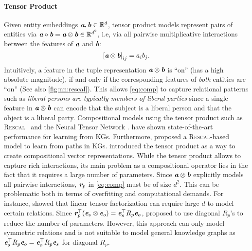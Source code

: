 \documentclass[letterpaper]{article}
\renewcommand{\vec}[1]{\textit{\textbf{#1}}}
\newcommand{\ve}{\vec{e}}
\newcommand{\vr}{\vec{r}}
\newcommand{\va}{\vec{a}}
\newcommand{\vb}{\vec{b}}
\newcommand{\comp}{\circ}
\newcommand{\rescal}{\textsc{Rescal}\xspace}
\newcommand{\transp}{\top}
\newcommand{\kron}{\otimes}
\newcommand{\R}{\mathbb{R}}
\begin{document}
\paragraph{Tensor Product}
Given entity embeddings $\va, \vb \in \R^d$, tensor product models
represent pairs of entities via ${\va \comp \vb = \va \kron \vb \in \R^{d^2}}$, i.e,
via all pairwise multiplicative interactions between the features of $\va$ and
$\vb$:
\begin{equation}
  \label{eq:kron}
  {[\va \kron \vb]}_{ij} = a_i b_j .
\end{equation}
Intuitively, a feature in the tuple representation $\va \kron \vb$ is ``on''
(has a high absolute magnitude), if and only if the corresponding features
of \emph{both} entities are ``on'' (See also \cref{fig:nn:rescal}). 
This allows \cref{eq:comp} to capture relational patterns such as 
\emph{liberal persons are typically members of liberal parties} since 
a single feature in $\va \kron \vb$ can encode that the subject is a 
liberal person and that the object is a liberal party.
Compositional models using the tensor product 
such as \rescal~\citep{nickel_three-way_2011}
and the Neural Tensor Network \citep{socher2013reasoning}.
have shown state-of-the-art performance for learning from KGs.
Furthermore, \citet{guu2015traversing} proposed a \textsc{Rescal}-based model to learn from paths in KGs.
\citet{smolensky_tensor_1990} introduced 
the tensor product as a way to create compositional vector representations.
While the tensor product allows to capture rich interactions, its main problem
as a compositional operator lies in the fact that it requires a large number of
parameters. Since $\va \kron \vb$ explicitly models all pairwise interactions,
$\vr_p$ in \cref{eq:comp} must be of size $d^2$. This can be problematic both in
terms of overfitting and computational demands. For instance,
\citet{nickel2014reducing} showed that linear tensor factorization can require
large $d$ to model certain relations. Since ${\vec{r}_p^\transp(\vec{e}_s \kron
  \vec{e}_o) =\ve_s^\transp R_p \ve_o}$, \citet{yang2015embedding} proposed to
use diagonal $R_p$'s to reduce the number of parameters. However, this approach
can only model symmetric relations and is not suitable to model general
knowledge graphs as $\ve_s^\transp R_p \ve_o = \ve_o^\transp R_p \ve_s$ for
diagonal $R_p$.
\end{document}
